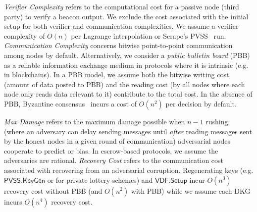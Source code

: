 \textit{Verifier Complexity} refers to the computational cost for a passive node (third party) to verify a beacon output. We exclude the cost associated with the initial setup for both verifier and communication complexities. We assume a verifier complexity of $O(n)$ per Lagrange interpolation or Scrape's PVSS~\cite{cascudo2017scrape} run. \textit{Communication Complexity} concerns bitwise point-to-point communication among nodes by default. Alternatively, we consider a \textit{public bulletin board} (PBB) as a reliable information exchange medium in protocols where it is intrinsic (e.g. in blockchains). In a PBB model, we assume both the bitwise writing cost (amount of data posted to PBB) and the reading cost (by all nodes where each node only reads data relevant to it) contribute to the total cost. In the absence of PBB, Byzantine consensus~\cite{castro1999practical} incurs a cost of $O(n^2)$ per decision by default.

\textit{Max Damage} refers to the maximum damage possible when $n - 1$ rushing~\cite{gennaro1999secure} (where an adversary can delay sending messages until \textit{after} reading messages sent by the honest nodes in a given round of communication) adversarial nodes cooperate to predict or bias. In escrow-based protocols, we assume the adversaries are rational. \textit{Recovery Cost} refers to the communication cost associated with recovering from an adversarial corruption. Regenerating keys (e.g. $\mathsf{PVSS.KeyGen}$ or for private lottery schemes) and $\mathsf{VDF.Setup}$ incur $O(n^3)$ recovery cost without PBB (and $O(n^2)$ with PBB) while we assume each DKG incurs $O(n^4)$ recovery cost.

